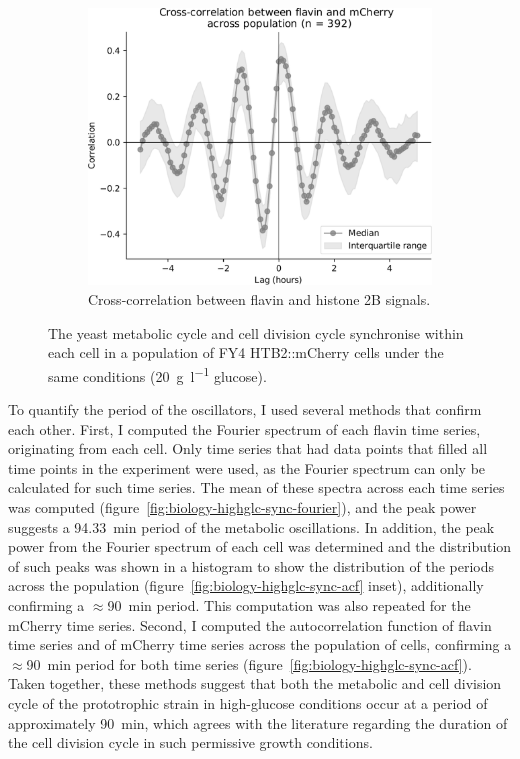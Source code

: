 \begin{figure}
  \begin{subfigure}[htpb]{0.4\textwidth}
   \centering
   \includegraphics[width=\textwidth]{xcf_edit.pdf}
   \caption{
    Cross-correlation between flavin and histone 2B signals.
   }
   \label{fig:biology-highglc-sync-xcf}
  \end{subfigure}

  \caption{
    The yeast metabolic cycle and cell division cycle synchronise within each cell in a population of FY4 HTB2::mCherry cells under the same conditions (\SI{20}{\gram~\litre^{-1}} glucose).
  }
  \label{fig:biology-highglc-sync}
\end{figure}

To quantify the period of the oscillators, I used several methods that confirm each other.
First, I computed the Fourier spectrum of each flavin time series, originating from each cell.
Only time series that had data points that filled all time points in the experiment were used, as the Fourier spectrum can only be calculated for such time series.
The mean of these spectra across each time series was computed (figure~\ref{fig:biology-highglc-sync-fourier}), and the peak power suggests a \SI{94.33}{\minute} period of the metabolic oscillations.
In addition, the peak power from the Fourier spectrum of each cell was determined and the distribution of such peaks was shown in a histogram to show the distribution of the periods across the population (figure~\ref{fig:biology-highglc-sync-acf} inset), additionally confirming a $\approx$\SI{90}{\minute} period.
This computation was also repeated for the mCherry time series.
Second, I computed the autocorrelation function of flavin time series and of mCherry time series across the population of cells, confirming a $\approx$\SI{90}{\minute} period for both time series (figure~\ref{fig:biology-highglc-sync-acf}).
Taken together, these methods suggest that both the metabolic and cell division cycle of the prototrophic strain in high-glucose conditions occur at a period of approximately \SI{90}{\minute}, which agrees with the literature regarding the duration of the cell division cycle in such permissive growth conditions.

